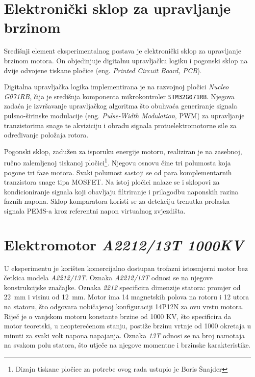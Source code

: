 \documentclass[diplomskirad]{fer}
\begin{document}
\section{Elektronički sklop za upravljanje brzinom}
\label{sec:esc}

Središnji element eksperimentalnog postava je elektronički sklop za upravljanje
brzinom motora. On objedinjuje digitalnu upravljačku logiku i pogonski sklop na
dvije odvojene tiskane pločice (eng. \textit{Printed Circuit Board, PCB}).

Digitalna upravljačka logika implementirana je na razvojnoj pločici
\textit{Nucleo G071RB}, čija je središnja komponenta mikrokontroler
\texttt{STM32G071RB}. Njegova zadaća je izvršavanje upravljačkog algoritma što
obuhvaća generiranje signala pulsno-širinske modulacije (eng.
\textit{Pulse-Width Modulation}, PWM) za upravljanje tranzistorima snage te
akviziciju i obradu signala protuelektromotorne sile za određivanje položaja
rotora.

Pogonski sklop, zadužen za isporuku energije motoru, realiziran je na zasebnoj,
ručno zalemljenoj tiskanoj pločici\footnote{Dizajn tiskane pločice za potrebe
	ovog rada ustupio je Boris Šnajder}. Njegovu osnovu čine tri polumosta koja
pogone tri faze motora. Svaki polumost sastoji se od para komplementarnih
tranzistora snage tipa MOSFET. Na istoj pločici nalaze se i sklopovi za
kondicioniranje signala koji obavljaju filtriranje i prilagodbu naponskih
razina faznih napona. Sklop komparatora koristi se za detekciju trenutka
prolaska signala PEMS-a kroz referentni napon virtualnog zvjezdišta.

\section{Elektromotor \textit{A2212/13T 1000KV}}
\label{sec:motor}

U eksperimentu je korišten komercijalno dostupan trofazni istosmjerni motor bez
četkica modela \textit{A2212/13T}. Oznaka \textit{A2212/13T} odnosi se na
njegove konstrukcijske značajke. Oznaka \textit{2212} specificira dimenzije
statora: promjer od \SI{22}{\milli\metre} i visinu od \SI{12}{\milli\metre}.
Motor ima 14 magnetskih polova na rotoru i 12 utora na statoru, što odgovara
uobičajenoj konfiguraciji 14P12N za ovu vrstu motora. Riječ je o vanjskom
motoru konstante brzine od 1000 KV, što specificira da motor teoretski, u
neopterećenom stanju, postiže brzinu vrtnje od 1000 okretaja u minuti za svaki
volt napona napajanja. Oznaka \textit{13T} odnosi se na broj namotaja na svakom
polu statora, što utječe na njegove momentne i brzinske karakteristike.
\end{document}
